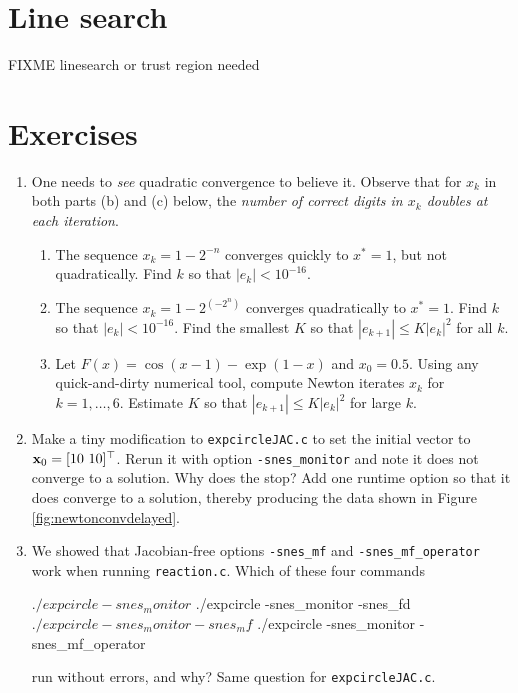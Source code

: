 \section{Line search} \label{sec:linesearch}

FIXME linesearch or trust region needed \citep{Kelley2003}


\section{Exercises}

\renewcommand{\labelenumi}{\arabic{chapter}.\arabic{enumi}\quad}
\renewcommand{\labelenumii}{(\alph{enumii})}
\begin{enumerate}
\item One needs to \emph{see} quadratic convergence to believe it.  Observe that for $x_k$ in both parts (b) and (c) below, the \emph{number of correct digits in $x_k$ doubles at each iteration}.
    \begin{enumerate}
    \item The sequence $x_k = 1-2^{-n}$ converges quickly to $x^*=1$, but not quadratically.  Find $k$ so that $|e_k| < 10^{-16}$.
    \item The sequence $x_k = 1-2^{(-2^n)}$ converges quadratically to $x^*=1$.  Find $k$ so that $|e_k| < 10^{-16}$.  Find the smallest $K$ so that $|e_{k+1}| \le K |e_k|^2$ for all $k$.
    \item Let $F(x) = \cos(x-1) - \exp(1-x)$ and $x_0=0.5$.  Using any quick-and-dirty numerical tool, compute Newton iterates $x_k$ for $k=1,\dots,6$.  Estimate $K$ so that $|e_{k+1}| \le K |e_k|^2$ for large $k$.
    \end{enumerate}

\item Make a tiny modification to \texttt{expcircleJAC.c} to set the initial vector to $\mathbf{x}_0 = [10\,\, 10]^\top$.  Rerun it with option \texttt{-snes\_monitor} and note it does not converge to a solution.  Why does the \pSNES stop?  Add one runtime option so that it does converge to a solution, thereby producing the data shown in Figure \ref{fig:newtonconvdelayed}.

\item We showed that Jacobian-free options \texttt{-snes\_mf} and \texttt{-snes\_mf\_operator} work when running \texttt{reaction.c}.  Which of these four commands
\begin{cline}
$ ./expcircle -snes_monitor
$ ./expcircle -snes_monitor -snes_fd
$ ./expcircle -snes_monitor -snes_mf
$ ./expcircle -snes_monitor -snes_mf_operator
\end{cline}
run without errors, and why?  Same question for \texttt{expcircleJAC.c}.


\end{enumerate}
